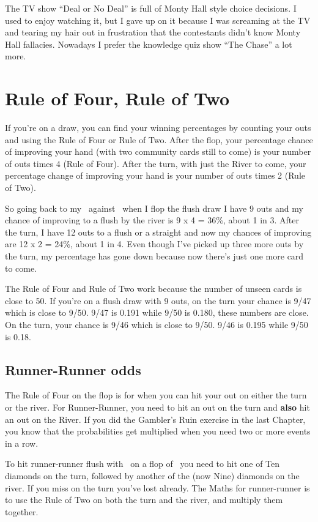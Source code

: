 The TV show ``Deal or No Deal'' is full of Monty Hall style choice
decisions. I used to enjoy watching it, but I gave up on it because I
was screaming at the TV and tearing my hair out in frustration that
the contestants didn't know Monty Hall fallacies. Nowadays I prefer the
knowledge quiz show ``The Chase'' a lot more.

\section{Rule of Four, Rule of Two}

If you're on a draw, you can find your winning percentages by counting
your outs and using the Rule of Four or Rule of Two. After the flop,
your percentage chance of improving your hand (with two community
cards still to come) is your number of outs
times 4 (Rule of Four). After the turn, with just the River to come,
your percentage change of improving your hand is your number of outs
times 2 (Rule of Two).

So going back to my \fourd\tred\ against \Ah\Jc\, when I flop the
flush draw I have 9 outs and my chance of improving to a flush by the
river is 9 x 4 = 36\%, about 1 in 3. After the turn, I have 12 outs to
a flush or a straight and now my chances of improving are 12 x 2 =
24\%, about 1 in 4. Even though I've picked up three more outs by the
turn, my percentage has gone down because now there's just one more
card to come.

The Rule of Four and Rule of Two work because the number of unseen
cards is close to 50. If you're on a flush draw with 9 outs, on the
turn your chance is 9/47 which is close to 9/50. 9/47 is 0.191 while
9/50 is 0.180, these numbers are close. On the turn, your chance is
9/46 which is close to 9/50. 9/46 is 0.195 while 9/50 is 0.18.

\subsection{Runner-Runner odds}

The Rule of Four on the flop is for when you can hit your out on
either the turn or the river. For Runner-Runner, you need to hit an
out on the turn and \textbf{also} hit an out on the River. If you did
the Gambler's Ruin exercise in the last Chapter, you know that the
probabilities get multiplied when you need two or more events in a
row.

To hit runner-runner flush with \eigd\fourd\ on a flop of \Ad\Qh\ninec\,
you need to hit one of Ten diamonds on the turn, followed by another
of the (now Nine) diamonds on the river. If you miss on the turn
you've lost already. The Maths for runner-runner is to use the Rule of
Two on both the turn and the river, and multiply them together.

